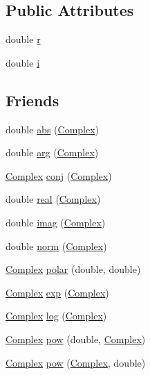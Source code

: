 \subsection*{Public Attributes}
\begin{DoxyCompactItemize}
\item 
double \hyperlink{classComplex_ab4ffe065c652c48177d3a03f16cd59b9}{r}
\item 
double \hyperlink{classComplex_aee19dc0cb922cb4f297ce76fa0455d3b}{i}
\end{DoxyCompactItemize}
\subsection*{Friends}
\begin{DoxyCompactItemize}
\item 
double \hyperlink{classComplex_ad40d8a08665a30daf84798c882b8e0ab}{abs} (\hyperlink{classComplex}{Complex})
\item 
double \hyperlink{classComplex_a7d704b645caf79fef50390c46391ea9b}{arg} (\hyperlink{classComplex}{Complex})
\item 
\hyperlink{classComplex}{Complex} \hyperlink{classComplex_a2c9040dfccfe8a4f0c4299f7ef248d0a}{conj} (\hyperlink{classComplex}{Complex})
\item 
double \hyperlink{classComplex_a38a2b53639409ca9fe7e09aa600a7ef8}{real} (\hyperlink{classComplex}{Complex})
\item 
double \hyperlink{classComplex_a430dbeb96d9b415652c6de8d375b9e74}{imag} (\hyperlink{classComplex}{Complex})
\item 
double \hyperlink{classComplex_a54bbdc88ae367835fecb5145d9b09635}{norm} (\hyperlink{classComplex}{Complex})
\item 
\hyperlink{classComplex}{Complex} \hyperlink{classComplex_a34f3a56dc625e6570a8d6310bed31617}{polar} (double, double)
\item 
\hyperlink{classComplex}{Complex} \hyperlink{classComplex_ad8b554aba89bf6238dbf98c47882a2f9}{exp} (\hyperlink{classComplex}{Complex})
\item 
\hyperlink{classComplex}{Complex} \hyperlink{classComplex_a02ab6b20774ff57128b73a2ad0687b93}{log} (\hyperlink{classComplex}{Complex})
\item 
\hyperlink{classComplex}{Complex} \hyperlink{classComplex_afcd6d70e762230eb43ed6ab29b074736}{pow} (double, \hyperlink{classComplex}{Complex})
\item 
\hyperlink{classComplex}{Complex} \hyperlink{classComplex_acf5a9b25d322be75b66b2bba36ab57db}{pow} (\hyperlink{classComplex}{Complex}, double)

\end{DoxyCompactItemize}
